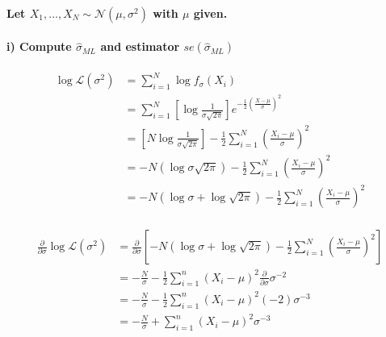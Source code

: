 \documentclass{article}
\renewcommand{\L}{\mathcal{L}}
\begin{document}
\paragraph{Let \(X_1, \ldots, X_N \sim \mathcal{N}(\mu, \sigma^2)\) with \(\mu\) given.}
\paragraph{i) Compute \(\hat{\sigma}_{ML}\) and estimator \(se(\hat{\sigma}_{ML})\)}
\begin{align*}
    \log \L(\sigma^2)
     & = \sum_{i=1}^N \log f_\sigma (X_i)                                                                                     \\
     & = \sum_{i=1}^N \left[\log \frac{1}{\sigma \sqrt{2 \pi}}\right] e^{-\frac{1}{2} \left(\frac{X - \mu}{\sigma}\right)^2}  \\
     & = \left[N \log \frac{1}{\sigma \sqrt{2 \pi}}\right] - \frac{1}{2} \sum_{i=1}^N \left(\frac{X_i - \mu}{\sigma}\right)^2 \\
     & = - N (\log \sigma \sqrt{2 \pi}) - \frac{1}{2} \sum_{i=1}^N \left(\frac{X_i - \mu}{\sigma}\right)^2                    \\
     & = - N (\log \sigma  + \log \sqrt{2 \pi}) - \frac{1}{2} \sum_{i=1}^N \left(\frac{X_i - \mu}{\sigma}\right)^2            \\
\end{align*}

\begin{align*}
    \frac{\partial}{\partial \sigma} \log \L(\sigma^2)
     & = \frac{\partial}{\partial \sigma} \left[ - N (\log \sigma  + \log \sqrt{2 \pi}) - \frac{1}{2} \sum_{i=1}^N \left(\frac{X_i - \mu}{\sigma}\right)^2 \right] \\
     & = - \frac{N}{\sigma} - \frac{1}{2} \sum_{i=1}^n \left(X_i - \mu\right)^2 \frac{\partial}{\partial \sigma} \sigma^{-2}                                       \\
     & = - \frac{N}{\sigma} - \frac{1}{2} \sum_{i=1}^n \left(X_i - \mu\right)^2 (-2)\sigma^{-3}                                                                    \\
     & = - \frac{N}{\sigma} +\sum_{i=1}^n \left(X_i - \mu\right)^2 \sigma^{-3}                                                                                     \\
\end{align*}
\end{document}
